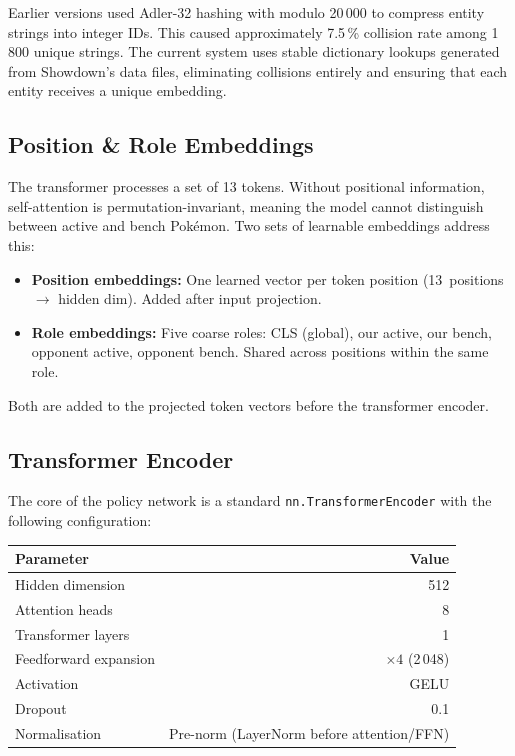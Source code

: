 Earlier versions used Adler-32 hashing with modulo 20\,000 to compress entity
strings into integer IDs.  This caused approximately 7.5\,\% collision rate
among 1\,800 unique strings.  The current system uses stable dictionary
lookups generated from Showdown's data files, eliminating collisions entirely
and ensuring that each entity receives a unique embedding.

\subsection{Position \& Role Embeddings}

The transformer processes a set of 13 tokens.  Without positional information,
self-attention is permutation-invariant, meaning the model cannot distinguish between
active and bench Pok\'{e}mon.  Two sets of learnable embeddings address this:

\begin{itemize}
  \item \textbf{Position embeddings:} One learned vector per token position
        (13~positions $\to$ hidden dim).  Added after input projection.
  \item \textbf{Role embeddings:} Five coarse roles: CLS (global), our
        active, our bench, opponent active, opponent bench.  Shared across
        positions within the same role.
\end{itemize}

Both are added to the projected token vectors before the transformer encoder.

\subsection{Transformer Encoder}

The core of the policy network is a standard \texttt{nn.TransformerEncoder}
with the following configuration:

\begin{center}
\small
\begin{tabularx}{0.6\textwidth}{l r}
  \toprule
  \textbf{Parameter} & \textbf{Value} \\
  \midrule
  Hidden dimension     & 512 \\
  Attention heads      & 8 \\
  Transformer layers   & 1 \\
  Feedforward expansion & $\times 4$ (2\,048) \\
  Activation           & GELU \\
  Dropout              & 0.1 \\
  Normalisation        & Pre-norm (LayerNorm before attention/FFN) \\
  \bottomrule
\end{tabularx}
\end{center}

